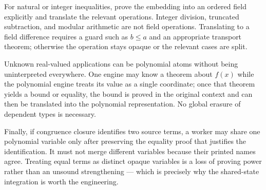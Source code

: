For natural or integer inequalities, prove the embedding into an ordered field
explicitly and translate the relevant operations. Integer division, truncated
subtraction, and modular arithmetic are not field operations. Translating
 to a field difference requires a guard such as $b\le a$ and
an appropriate transport theorem; otherwise the operation stays opaque or the
relevant cases are split.

Unknown real-valued applications can be polynomial atoms without being
uninterpreted everywhere. One engine may know a theorem about $f(x)$ while the
polynomial engine treats its value as a single coordinate; once that theorem
yields a bound or equality, the bound is proved in the original context and can
then be translated into the polynomial representation. No global erasure of
dependent types is necessary.

Finally, if congruence closure identifies two source terms, a worker may share
one polynomial variable only after preserving the equality proof that justifies
the identification. It must not merge different variables because their printed
names agree. Treating equal terms as distinct opaque variables is a loss of
proving power rather than an unsound strengthening --- which is precisely why the
shared-state integration is worth the engineering.
